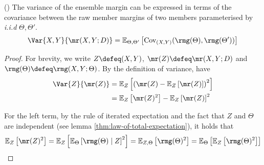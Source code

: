 \documentclass[
	twoside=false, %
]{kaobook}
\begin{document}
\begin{theorem} (\cite{breiman_RandomForests_2001})
  \label{thm:breiman}
The variance of the ensemble margin can be expressed in terms of the covariance between the raw member margins of two members parameterised by \textit{i.i.d} $\Theta, \Theta'$.
	$$
	\Var{X,Y}{\mr(X,Y;D)} = \mathbb{E}_{\Theta, \Theta'}\left[ \text{Cov}_{(X,Y)}(\rmg(\Theta), \rmg(\Theta') ) \right] 
	$$
\end{theorem}
\begin{proof}
	For brevity, we write
	  $Z \defeq (X,Y)$,
	 $\mr(Z) \defeq \mr(X,Y;D)$ and
	 $\rmg(\Theta) \defeq \rmg(X,Y;\Theta)$.
By the definition of variance, have
\begin{align*}
\Var{Z}{\mr(Z)} &= \mathbb{E}_{Z}\left[ \left(\mr(Z) - \mathbb{E}_{Z}\left[ \mr(Z) \right]\right) ^2 \right]  \\
&= \mathbb{E}_{Z}\left[ \mr(Z)^2 \right] - \mathbb{E}_{Z}\left[ \mr(Z) \right] ^2 \\
\end{align*}

For the left term, by the rule of iterated expectation and the fact that $Z$ and $\Theta$ are independent (see lemma \ref{thm:law-of-total-expectation}), it holds that
$$
\mathbb{E}_{Z}\left[ \mr(Z) ^2 \right]  = \mathbb{E}_{Z}\left[ \mathbb{E}_{\Theta}\left[ \rmg(\Theta) \mid Z \right] ^2  \right] = \mathbb{E}_{Z, \Theta}\left[ \rmg(\Theta)^2 \right] %
= \mathbb{E}_{\Theta}\left[ \mathbb{E}_{Z}\left[ \rmg(\Theta) ^2 \right]  \right] 
$$


\end{proof}
\end{document}
